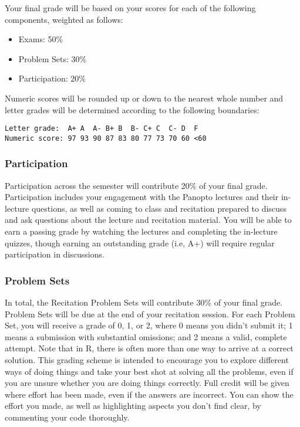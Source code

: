 \documentclass[
  letterpaper,
  DIV=11,
  numbers=noendperiod]{scrartcl}
\providecommand{\tightlist}{%
  \setlength{\itemsep}{0pt}\setlength{\parskip}{0pt}}\usepackage{longtable,booktabs,array}
\begin{document}
Your final grade will be based on your scores for each of the following
components, weighted as follows:

\begin{itemize}
\tightlist
\item
  Exams: 50\%
\item
  Problem Sets: 30\%
\item
  Participation: 20\%
\end{itemize}

Numeric scores will be rounded up or down to the nearest whole number
and letter grades will be determined according to the following
boundaries:

\begin{verbatim}
Letter grade:  A+ A  A- B+ B  B- C+ C  C- D  F
Numeric score: 97 93 90 87 83 80 77 73 70 60 <60
\end{verbatim}

\hypertarget{participation}{%
\subsubsection{Participation}\label{participation}}

Participation across the semester will contribute 20\% of your final
grade. Participation includes your engagement with the Panopto lectures
and their in-lecture questions, as well as coming to class and
recitation prepared to discuss and ask questions about the lecture and
recitation material. You will be able to earn a passing grade by
watching the lectures and completing the in-lecture quizzes, though
earning an outstanding grade (i.e, A+) will require regular
participation in discussions.

\hypertarget{problem-sets}{%
\subsubsection{Problem Sets}\label{problem-sets}}

In total, the Recitation Problem Sets will contribute 30\% of your final
grade. Problem Sets will be due at the end of your recitation session.
For each Problem Set, you will receive a grade of 0, 1, or 2, where 0
means you didn't submit it; 1 means a submission with substantial
omissions; and 2 means a valid, complete attempt. Note that in R, there
is often more than one way to arrive at a correct solution. This grading
scheme is intended to encourage you to explore different ways of doing
things and take your best shot at solving all the problems, even if you
are unsure whether you are doing things correctly. Full credit will be
given where effort has been made, even if the answers are incorrect. You
can show the effort you made, as well as highlighting aspects you don't
find clear, by commenting your code thoroughly.
\end{document}
